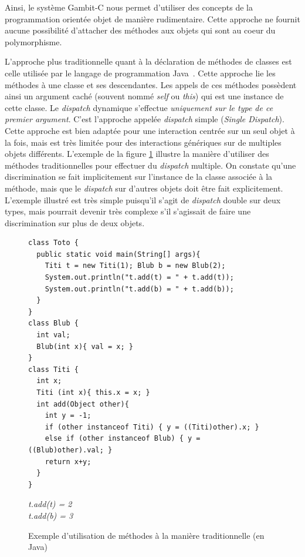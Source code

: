 \documentclass[12pt,twoside,letterpaper,francais]{book}
\begin{document}
Ainsi, le système Gambit-C nous permet d'utiliser des concepts de la
programmation orientée objet de manière rudimentaire. Cette approche
ne fournit aucune possibilité d'attacher des méthodes aux objets qui
sont au coeur du polymorphisme.

L'approche plus traditionnelle quant à la déclaration de méthodes de
classes est celle utilisée par le langage de programmation
Java~\cite{JavaSpec}. Cette approche lie les méthodes à une classe et
ses descendantes. Les appels de ces méthodes possèdent ainsi un
argument caché (souvent nommé \textit{self} ou \textit{this}) qui est
une instance de cette classe. Le \textit{dispatch} dynamique
s'effectue \emph{uniquement sur le type de ce premier argument}. C'est
l'approche appelée \textit{dispatch} simple (\textit{Single
  Dispatch}). Cette approche est bien adaptée pour une interaction
centrée sur un seul objet à la fois, mais est très limitée pour des
interactions génériques sur de multiples objets différents. L'exemple
de la figure \ref{OO:JavaDispatch} illustre la manière d'utiliser des
méthodes traditionnelles pour effectuer du \textit{dispatch}
multiple. On constate qu'une discrimination se fait implicitement sur
l'instance de la classe associée à la méthode, mais que le
\textit{dispatch} sur d'autres objets doit être fait
explicitement. L'exemple illustré est très simple puisqu'il s'agit de
\textit{dispatch} double sur deux types, mais pourrait devenir très
complexe s'il s'agissait de faire une discrimination sur plus de deux
objets.\\

\begin{figure}[h!]
  \begin{verbatim}
class Toto {
  public static void main(String[] args){
    Titi t = new Titi(1); Blub b = new Blub(2);
    System.out.println("t.add(t) = " + t.add(t));
    System.out.println("t.add(b) = " + t.add(b));
  }
} 
class Blub {
  int val;
  Blub(int x){ val = x; }
}
class Titi {
  int x;
  Titi (int x){ this.x = x; }
  int add(Object other){
    int y = -1;
    if (other instanceof Titi) { y = ((Titi)other).x; }
    else if (other instanceof Blub) { y = ((Blub)other).val; }
    return x+y;
  }
}
  \end{verbatim}
  {{\it
t.add(t) = 2\\
t.add(b) = 3
  }}
  \caption{Exemple d'utilisation de méthodes à la manière
    traditionnelle (en Java)}
  \label{OO:JavaDispatch}
\end{figure}

\FloatBarrier
\end{document}
